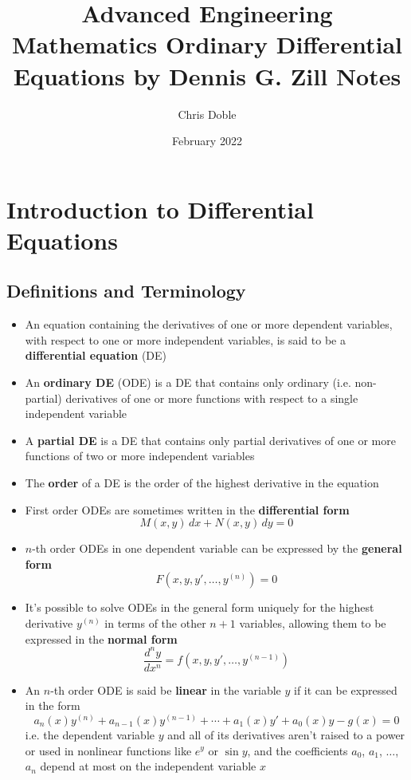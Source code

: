 \documentclass{article}
\title{Advanced Engineering Mathematics Ordinary Differential Equations by Dennis G. Zill Notes}
\author{Chris Doble}
\date{February 2022}
\begin{document}
\maketitle

\tableofcontents

\section{Introduction to Differential Equations}

\subsection{Definitions and Terminology}

\begin{itemize}
  \item An equation containing the derivatives of one or more dependent variables, with respect to one or more independent variables, is said to be a \textbf{differential equation} (DE)

  \item An \textbf{ordinary DE} (ODE) is a DE that contains only ordinary (i.e. non-partial) derivatives of one or more functions with respect to a single independent variable

  \item A \textbf{partial DE} is a DE that contains only partial derivatives of one or more functions of two or more independent variables

  \item The \textbf{order} of a DE is the order of the highest derivative in the equation

  \item First order ODEs are sometimes written in the \textbf{differential form} \[M(x, y) \,dx + N(x, y) \,dy = 0\]

  \item $n$-th order ODEs in one dependent variable can be expressed by the \textbf{general form} \[F(x, y, y', \ldots, y^{(n)}) = 0\]

  \item It's possible to solve ODEs in the general form uniquely for the highest derivative $y^{(n)}$ in terms of the other $n + 1$ variables, allowing them to be expressed in the \textbf{normal form} \[\frac{d^n y}{d x^n} = f(x, y, y', \ldots, y^{(n - 1)})\]

  \item An $n$-th order ODE is said be \textbf{linear} in the variable $y$ if it can be expressed in the form \[a_n(x) y^{(n)} + a_{n-1}(x) y^{(n - 1)} + \cdots + a_1(x) y' + a_0(x) y - g(x) = 0\] i.e. the dependent variable $y$ and all of its derivatives aren't raised to a power or used in nonlinear functions like $e^y$ or $\sin y$, and the coefficients $a_0$, $a_1$, $\ldots$, $a_n$ depend at most on the independent variable $x$


\end{itemize}
\end{document}
